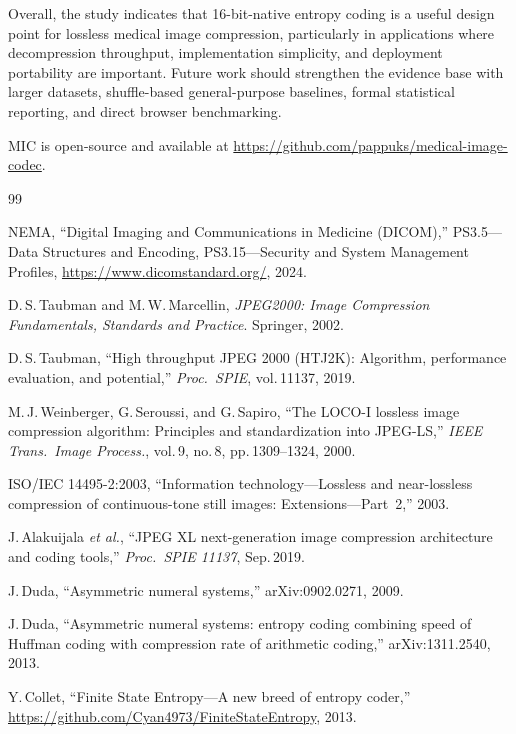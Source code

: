 \documentclass[journal]{IEEEtran}
\begin{document}
Overall, the study indicates that 16-bit-native entropy coding is a useful
design point for lossless medical image compression, particularly in
applications where decompression throughput, implementation simplicity, and
deployment portability are important. Future work should strengthen the evidence
base with larger datasets, shuffle-based general-purpose baselines, formal
statistical reporting, and direct browser benchmarking.

MIC is open-source and available at
\url{https://github.com/pappuks/medical-image-codec}.


\begin{thebibliography}{99}

NEMA, ``Digital Imaging and Communications in Medicine (DICOM),''
PS3.5---Data Structures and Encoding, PS3.15---Security and System Management
Profiles,
\url{https://www.dicomstandard.org/}, 2024.

D.\,S.\,Taubman and M.\,W.\,Marcellin,
\textit{JPEG2000: Image Compression Fundamentals, Standards and Practice}.
Springer, 2002.

D.\,S.\,Taubman, ``High throughput JPEG 2000 (HTJ2K): Algorithm, performance
evaluation, and potential,'' \textit{Proc.\ SPIE}, vol.\,11137, 2019.

M.\,J.\,Weinberger, G.\,Seroussi, and G.\,Sapiro,
``The LOCO-I lossless image compression algorithm: Principles and
standardization into JPEG-LS,''
\textit{IEEE Trans.\ Image Process.}, vol.\,9, no.\,8, pp.\,1309--1324, 2000.

ISO/IEC 14495-2:2003, ``Information technology---Lossless and near-lossless
compression of continuous-tone still images: Extensions---Part~2,'' 2003.

J.\,Alakuijala \textit{et al.},
``JPEG XL next-generation image compression architecture and coding tools,''
\textit{Proc.\ SPIE 11137}, Sep.\,2019.

J.\,Duda, ``Asymmetric numeral systems,'' arXiv:0902.0271, 2009.

J.\,Duda, ``Asymmetric numeral systems: entropy coding combining speed of
Huffman coding with compression rate of arithmetic coding,''
arXiv:1311.2540, 2013.

Y.\,Collet, ``Finite State Entropy---A new breed of entropy coder,''
\url{https://github.com/Cyan4973/FiniteStateEntropy}, 2013.


\end{thebibliography}
\end{document}
